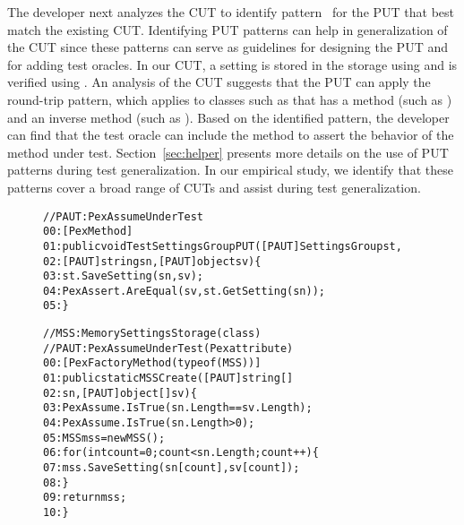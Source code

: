 The developer next analyzes the CUT to identify pattern~\cite{PEXDOC} for the PUT that best match the existing CUT. Identifying PUT patterns can help in generalization of the CUT since these patterns can serve as guidelines for designing the PUT and for adding test oracles. In our CUT, a setting is stored in the storage using  and is verified using . An analysis of the CUT suggests that the PUT can apply the round-trip pattern, which applies to classes such as  that has a method (such as ) and an inverse method (such as ). Based on the identified pattern, the developer can find that the test oracle can include the  method to assert the behavior of the  method under test. Section~\ref{sec:helper} presents more details on the use of PUT patterns during test generalization. In our empirical study, we identify that these patterns cover a broad range of CUTs and assist during test generalization.

\begin{figure}[t]
\begin{CodeOut}
\begin{alltt}
//PAUT: PexAssumeUnderTest
00:[PexMethod]
01:public void TestSettingsGroupPUT([PAUT] SettingsGroup st, 
02:\hspace*{0.1in}[PAUT] string sn, [PAUT] object sv) \{
03:\hspace*{0.2in}st.SaveSetting(sn, sv);
04:\hspace*{0.2in}PexAssert.AreEqual(sv, st.GetSetting(sn));
05:\}
\end{alltt}
\end{CodeOut}\vspace*{-4ex}

\begin{CodeOut}
\begin{alltt}
//MSS: MemorySettingsStorage (class)
//PAUT: PexAssumeUnderTest	(Pex attribute)
00:[PexFactoryMethod(typeof(MSS))]
01:public static MSS Create([PAUT]string[] 
02:\hspace*{0.3in}sn, [PAUT]object[] sv) \{
03:\hspace*{0.2in}PexAssume.IsTrue(sn.Length == sv.Length);
04:\hspace*{0.2in}PexAssume.IsTrue(sn.Length > 0);
05:\hspace*{0.2in}MSS mss = new MSS();
06:\hspace*{0.2in}for (int count = 0; count < sn.Length; count++) \{
07:\hspace*{0.3in}mss.SaveSetting(sn[count], sv[count]);
08:\hspace*{0.2in}\}
09:\hspace*{0.2in}return mss;
10:\}
\end{alltt}
\end{CodeOut}\vspace*{-4ex}
 \vspace*{-1ex}
\end{figure}

